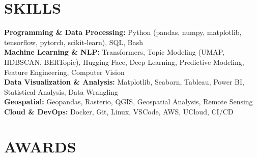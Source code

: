 \documentclass{resume}
\begin{document}
\section{SKILLS} 
\begin{content}
    {\bf Programming \& Data Processing:} Python {\footnotesize (pandas, numpy, matplotlib, tensorflow, pytorch, scikit-learn)}, SQL, Bash \\
    {\bf Machine Learning \& NLP:} Transformers, Topic Modeling {\footnotesize (UMAP, HDBSCAN, BERTopic)}, Hugging Face, Deep Learning, Predictive Modeling, Feature Engineering, Computer Vision \\
    {\bf Data Visualization \& Analysis:} Matplotlib, Seaborn, Tableau, Power BI, Statistical Analysis, Data Wrangling \\
    {\bf Geospatial:} Geopandas, Rasterio, QGIS, Geospatial Analysis, Remote Sensing \\
    {\bf Cloud \& DevOps:} Docker, Git, Linux, VSCode, AWS, UCloud, CI/CD \\
\end{content}


\section{AWARDS}
\begin{content}
     \\
     \\
\end{content}

\end{document}
